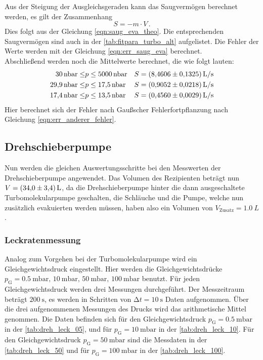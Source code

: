     \noindent Aus der Steigung der Ausgleichsgeraden kann das Saugvermögen berechnet werden, es gilt der Zusammenhang
    \begin{equation*}
      S = - m \cdot V\, .
    \end{equation*}
    Dies folgt aus der Gleichung \eqref{eqn:saug_eva_theo}. Die entsprechenden Saugvermögen sind auch in der \autoref{tab:fitpara_turbo_alt} aufgelistet. 
    Die Fehler der Werte werden mit der Gleichung \eqref{eqn:err_saug_eva} berechnet.\\ 
    Abschließend werden noch die Mittelwerte berechnet, die wie folgt lauten:
    \begin{align*}
      \SI{30}{\nano\bar} \leq &p \leq \SI{5000}{\nano\bar} & S &= \SI{8.4606 \pm 0.1325}{L\per\second} \\
      \SI{29.9}{\nano\bar} \leq &p \leq \SI{17.5}{\nano\bar}& S &= \SI{0.9052 \pm 0.0218}{L\per\second} \\
      \SI{17.4}{\nano\bar} \leq &p \leq \SI{13.5}{\nano\bar} & S &= \SI{0.4560 \pm 0.0029}{L\per\second}
    \end{align*}
    Hier berechnet sich der Fehler nach Gaußscher Fehlerfortpflanzung nach Gleichung \eqref{eqn:err_anderer_fehler}.

\subsection{Drehschieberpumpe}

    \noindent Nun werden die gleichen Auswertungsschritte bei den Messwerten der Drehschieberpumpe angewendet. Das Volumen des Rezipienten beträgt nun $V = \SI{34 \pm 3.4}{L}$, da die 
    Drehschieberpumpe hinter die dann ausgeschaltete Turbomolekularpumpe geschalten, die Schläuche und die Pumpe, welche nun zusätzlich evakuierten werden müssen, haben also ein Volumen von $V_\text{Zusatz} = \SI{1.0}{L}$. 

    \subsubsection{Leckratenmessung}

    \noindent Analog zum Vorgehen bei der Turbomolekularpumpe wird ein Gleichgewichtsdruck eingestellt. Hier werden die
    Gleichgewichtsdrücke $p_\text{G} = \SI{0.5}{\milli\bar}, \, \SI{10}{\milli\bar}, \, \SI{50}{\milli\bar}, \, \SI{100}{\milli\bar}$ benutzt. Für jeden Gleichgewichtsdruck werden 
    drei Messungen durchgeführt. Der Messzeitraum beträgt $\SI{200}{\second}$, es werden in Schritten von $\increment t = \SI{10}{\second}$ Daten aufgenommen. Über die drei aufgenommenen
    Messungen des Drucks wird das arithmetische Mittel genommen. 
    Die Daten befinden sich für den Gleichgewichtsdruck $p_\text{G} = \SI{0.5}{\milli\bar}$ in der \autoref{tab:dreh_leck_05}, und für $p_\text{G} = \SI{10}{\milli\bar}$ in der 
    \autoref{tab:dreh_leck_10}. Für den Gleichgewichtsdruck $p_\text{G} = \SI{50}{\milli\bar}$ sind die Messdaten in der \autoref{tab:dreh_leck_50} und für $p_\text{G} = \SI{100}{\milli\bar}$
    in der \autoref{tab:dreh_leck_100}.

